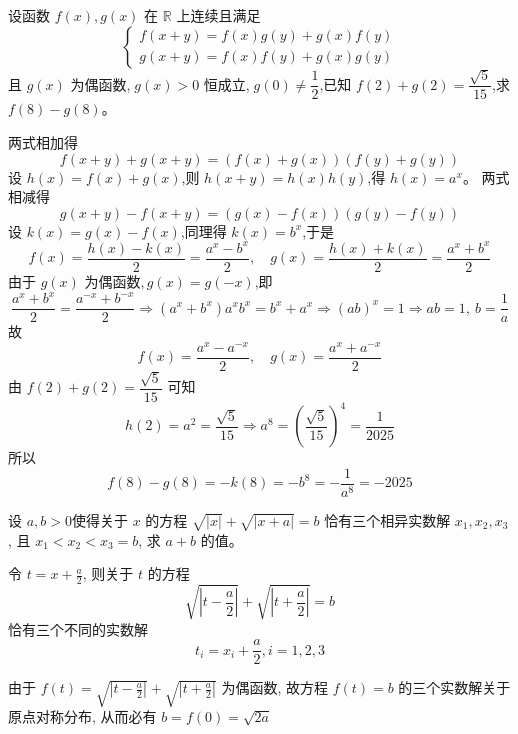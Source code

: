 \begin{questions}
    \question 设函数 $f(x), g(x)$ 在 $\mathbb{R}$ 上连续且满足
    \[
    \begin{cases}
    f(x+y) = f(x)g(y) + g(x)f(y) \\
    g(x+y) = f(x)f(y) + g(x)g(y)
    \end{cases}
    \]
    且 $g(x)$ 为偶函数,$\;g(x) > 0$ 恒成立,$\;g(0) \ne \dfrac{1}{2}$,已知 $f(2) + g(2) = \dfrac{\sqrt{5}}{15}$,求 $f(8) - g(8)$。
    \begin{solution}
        两式相加得
        \[
        f(x+y) + g(x+y) = (f(x) + g(x))(f(y) + g(y))
        \]
        设 $h(x) = f(x) + g(x)$,则 $h(x+y) = h(x)h(y)$,得 $h(x) = a^x$。
        两式相减得
        \[
        g(x+y) - f(x+y) = (g(x) - f(x))(g(y) - f(y))
        \]
        设 $k(x) = g(x) - f(x)$,同理得 $k(x) = b^x$,于是
        \[
        f(x) = \frac{h(x) - k(x)}{2} = \frac{a^x - b^x}{2},\quad
        g(x) = \frac{h(x) + k(x)}{2} = \frac{a^x + b^x}{2}
        \]
        由于 $g(x)$ 为偶函数,$\,g(x) = g(-x)$,即
        \[
        \frac{a^x + b^x}{2} = \frac{a^{-x} + b^{-x}}{2} \Rightarrow (a^x + b^x) a^x b^x = b^x + a^x \Rightarrow (ab)^x = 1 \Rightarrow ab = 1,\ b = \frac{1}{a}
        \]
        故
        \[
        f(x) = \frac{a^x - a^{-x}}{2},\quad
        g(x) = \frac{a^x + a^{-x}}{2}
        \]
        由 $f(2) + g(2) = \dfrac{\sqrt{5}}{15}$ 可知
        \[
        h(2) = a^2 = \frac{\sqrt{5}}{15}
        \Rightarrow a^8 = \left( \frac{\sqrt{5}}{15} \right)^4 = \frac{1}{2025}
        \]
        所以
        \[
        f(8) - g(8) = -k(8) = -b^8 = -\frac{1}{a^8} = -2025
        \]
    \end{solution}

    \question 设 $a,b>0$使得关于 $x$ 的方程 $\sqrt{|x|}+\sqrt{|x+a|}=b$ 恰有三个相异实数解 $x_1,x_2,x_3$, 且 $x_1<x_2<x_3=b$, 求 $a+b$ 的值。
    \begin{solution}
        令 $t=x+\frac{a}{2}$, 则关于 $t$ 的方程 $$\sqrt{\left|t-\frac{a}{2}\right|}+\sqrt{\left|t+\frac{a}{2}\right|}=b$$ 恰有三个不同的实数解 $$t_i=x_i+\frac{a}{2},i=1,2,3$$

        由于 $f(t)=\sqrt{|t-\frac{a}{2}|}+\sqrt{|t+\frac{a}{2}|}$ 为偶函数, 故方程 $f(t)=b$ 的三个实数解关于原点对称分布, 从而必有 $b=f(0)=\sqrt{2a}$
        

\end{solution}
\end{questions}
